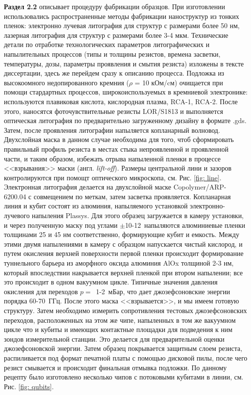 \textbf{Раздел 2.2} описывает процедуру фабрикации образцов. При изготовлении использовались распространенные методы фабрикации наноструктур из тонких пленок: электронно лучевая литография для структур с размерами более 50 нм, лазерная литография для структур с размерами более 3-4 мкм. Технические детали по отработке технологических параметров литографических и напылительных процессов (типы и толщины резистов, времена засветки, температуры, дозы, параметры проявления и смытия резиста) изложены в тексте диссертации, здесь же перейдем сразу к описанию процесса. Подложка из высокоомного недопированного кремния ($\rho$ = 10 кОм/cм) очищается при помощи стардартных процессов, широкоиспользуемых в кремниевой электронике: используются плавиковая кислота, кислородная плазма, RCA-1, RCA-2. После этого, наносятся фоточувствительные резисты LOR/S1813 и выполняется оптическая литография по предварительно загруженному дизайну в формате .gds. Затем, после проявления литографии напыляется копланарный волновод. Двухслойная маска в данном случае необходима для того, чтоб сформировать правильный профиль резиста в местах стыка непроявленной и проявленной части, и таким образом, избежать отрыва напыленной пленки в процессе <<взрывания>> маски (англ. \textit{lift-off}). Размеры центральной лини и зазоров контролируются при помощт оптического микроскопа, см. Рис. \ref{fig: line}. Электронная литография делается на двухслойной маске Copolymer/ARP-6200.04 с совмещением по меткам, затем засветка проявляется. Копланарная линия и кубит состоят из алюминия, напыляемого установкой электронно-лучевого напыления Plassys. Для этого образец загружается в камеру установки, и через полученную маску под углами $\pm$10-12\textdegree~напыляются алюминиевые пленки толщинами 25 и 45 нм соответственно, формирующие кубит и емкость. Между этими двумя напылениями в камеру с образцом напускается чистый кислород, и путем окисления верхней поверхности первой пленки происходит формирование туннельного барьера из аморфного оксида алюминия AlOx толщиной 2-3 нм, который впоследствии накрывается верхней пленкой при втором напылении; все это происходит в одном вакуумном цикле.  Типичные значения давления окисления для переходов  $p=$~1-2~мБар, что дает джозефсоновские энергии порядка 60-70~ГГц. После этого маска <<взрывается>>, и мы имеем готовую структуру. Затем необходимо измерить сопротивления тестовых джозефсоновских переходов, расположенных на этом же чипе, напыленных в том же вакуумном цикле что и кубиты и имеющих контактные площадки для подведения к ним зондов измерительной станции. Это делается для предварительной оценки джозефсоновской энергии. Затем образец покрывается защитным слоем резиста, распиливается под формат печатной платы с помощью дисковой пилы, после чего резист смывается и происходит финальная отмывка подложки. По данному рецепту было изготовлено несколько чипов с потоковыми кубитами в линии, см. Рис. \ref{fig: qubits}. 

